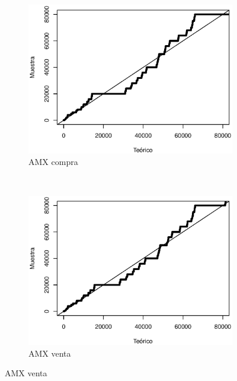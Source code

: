 \documentclass[11pt]{article}
\numberwithin{equation}{section} %
\begin{document}
\clearpage

\begin{figure}[htbp]
\centering
\begin{subfigure}[b]{0.5\textwidth}
\centering
\includegraphics[width=\textwidth, trim=0 0.5cm 0 1cm]{amxvolumencompraqq.eps}
\caption{AMX compra}
\label{fig:amxvolumencompraqq}
\end{subfigure}%
~ %
\begin{subfigure}[b]{0.5\textwidth}
\centering
\includegraphics[width=\textwidth, trim=0 0.5cm 0 1cm]{amxvolumenventaqq.eps}
\caption{AMX venta}
\label{fig:amxvolumenventaqq}
\end{subfigure}


\end{figure}
\end{document}
